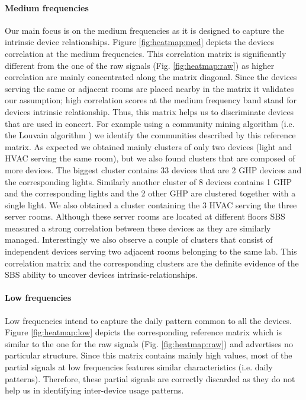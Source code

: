 \paragraph{Medium frequencies}
Our main focus is on the medium frequencies as it is designed to capture the intrinsic device relationships.
Figure \ref{fig:heatmap:med} depicts the devices correlation at the medium frequencies.
This correlation matrix is significantly different from the one of the raw signals (Fig. \ref{fig:heatmap:raw}) as higher correlation are mainly concentrated along the matrix diagonal. 
Since the devices serving the same or adjacent rooms are placed nearby in the matrix it validates our assumption; high correlation scores at the medium frequency band stand for devices intrinsic relationship.
Thus, this matrix helps us to discriminate devices that are used in concert.
For example using a community mining algorithm (i.e. the Louvain algorithm \cite{blondel:unfolding}) we identify the communities described by this reference matrix.
As expected we obtained mainly clusters of only two devices (light and HVAC serving the same room), but we also found clusters that are composed of more devices.
The biggest cluster contains 33 devices that are 2 GHP devices and the corresponding lights.
Similarly another cluster of 8 devices contains 1 GHP and the corresponding lights and the 2 other GHP are clustered together with a single light.
We also obtained a cluster containing the 3 HVAC serving the three server rooms. Although these server rooms are located at different floors SBS measured a strong correlation between these devices as they are similarly managed.
Interestingly we also observe a couple of clusters that consist of independent devices serving two adjacent rooms belonging to the same lab.
This correlation matrix and the corresponding clusters are the definite evidence of the SBS ability to uncover devices intrinsic-relationships.
 
\paragraph{Low frequencies}
Low frequencies intend to capture the daily pattern common to all the devices.
Figure \ref{fig:heatmap:low} depicts the corresponding reference matrix which is similar to the one for the raw signals (Fig. \ref{fig:heatmap:raw}) and advertises no particular structure.
Since this matrix contains mainly high values, most of the partial signals at low frequencies features similar characteristics (i.e. daily patterns).
Therefore, these partial signals are correctly discarded as they do not help us in identifying inter-device usage patterns.
 
